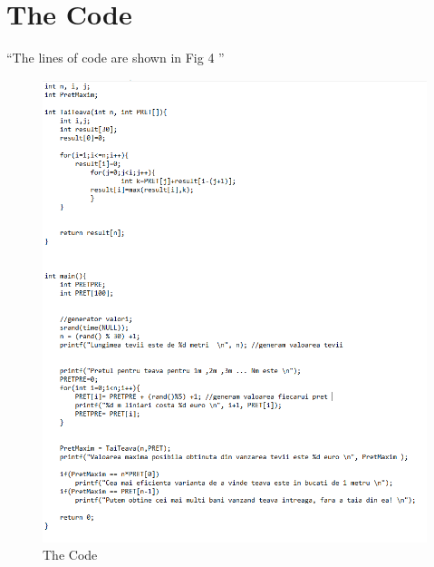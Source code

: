 \documentclass{article}
\begin{document}
\section{The Code}
``The lines of code are shown in Fig 4 '' \
\begin{figure}[h!]
\centering
\includegraphics[scale=0.6]{codec.PNG}
\caption{The Code}
\label{fig:universe}
\end{figure}
\end{document}
